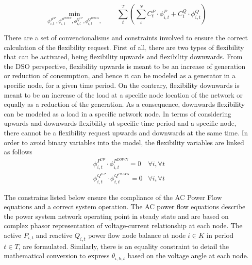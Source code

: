 \begin{equation*}
\!\min_{\phi_{i,t}^{P^{UP}},\phi_{i,t}^{P^{DOWN}},\phi_{i,t}^{Q^{UP}},\phi_{i,t}^{Q^{DOWN}},}  \qquad \sum_{t}^{T} \left( \sum_{i}^{N} C_t^{P} \cdot \phi_{i,t}^{P} + C_t^{Q} \cdot \phi_{i,t}^{Q} \right)  
\end{equation*}

There are a set of convencionalisms and constraints involved to ensure the correct calculation of the flexibility request. First of all, there are two types of flexibility that can be activated, being flexibility upwards and flexibility downwards. From the DSO perspective, flexibility upwards is meant to be an increase of generation or reduction of consumption, and hence it can be modeled as a generator in a specific node, for a given time period. On the contrary, flexibility downwards is meant to be an increase of the load at a specific node location of the network or equally as a reduction of the generation. As a consequence, downwards flexibility can be modeled as a load in a specific network node. 
In terms of considering upwards and downwards flexibility at specific time period and a specific node, there cannot be a flexibility request upwards and downwards at the same time. In order to avoid binary variables into the model, the flexibility variables are linked as follows
\begin{subequations}
\begin{align*}
& \phi_{i,t}^{P^{UP}} \cdot \phi_{i,t}^{P^{DOWN}} = 0 & \forall i,\forall t \\
& \phi_{i,t}^{Q^{UP}} \cdot \phi_{i,t}^{Q^{DOWN}} = 0 & \forall i,\forall t 
\end{align*}
\end{subequations}

The constrains listed below ensure the compliance of the AC Power Flow equations and a correct system operation. The AC power flow equations describe the power system network operating point in steady state and are based on complex phasor representation of voltage-current relationship at each node. The active $P_{i,t}$ and reactive $Q_{i,t}$ power flow node balance at node $i \in K$ in period  $t \in T$, are formulated. Similarly, there is an equality constraint to detail the mathematical conversion to express  $\theta_{i,k,t}$ based on the voltage angle at each node.

